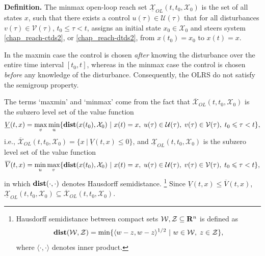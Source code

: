 \documentclass[letterpaper,10pt,english]{sphinxmanual}
\begin{document}
\textbf{Definition.} The minmax open-loop reach set
\(\underline{{\mathcal X}}_{OL}(t, t_0, {\mathcal X}_0)\) is the set
of all states \(x\), such that there exists a control
\(u(\tau)\in{\mathcal U}(\tau)\) that for all disturbances
\(v(\tau)\in{\mathcal V}(\tau)\), \(t_0\leqslant\tau<t\),
assigns an initial state \(x_0\in{\mathcal X}_0\) and steers system
\eqref{chap_reach-ctds2}, or \eqref{chap_reach-dtds2}, from \(x(t_0)=x_0\) to \(x(t)=x\).

In the maxmin case the control is chosen
\emph{after} knowing the disturbance over the entire time interval
\([t_0, t]\), whereas in the minmax case the control is chosen
\emph{before} any knowledge of the disturbance. Consequently, the OLRS do not
satisfy the semigroup property.

The terms ‘maxmin’ and ‘minmax’ come from the fact that
\(\overline{{\mathcal X}}_{OL}(t, t_0, {\mathcal X}_0)\) is the
subzero level set of the value function
\label{chap_reach:equation-maxminvf}\begin{gather}
\begin{split}\underline{V}(t, x) =
\max_v\min_u\{{\bf dist}(x(t_0), {\mathcal X}_0) ~|~ x(t)=x, \; u(\tau)\in{\mathcal U}(\tau), \;
v(\tau)\in{\mathcal V}(\tau), \; t_0\leqslant\tau<t\},\end{split}\label{chap_reach-maxminvf}
\end{gather}
i.e.,
\(\overline{{\mathcal X}}_{OL}(t, t_0, {\mathcal X}_0) = \{ x~|~\underline{V}(t, x) \leqslant0\}\),
and \(\underline{{\mathcal X}}_{OL}(t, t_0, {\mathcal X}_0)\) is the
subzero level set of the value function
\label{chap_reach:equation-minmaxvf}\begin{gather}
\begin{split}\overline{V}(t, x) =
\min_u\max_v\{{\bf dist}(x(t_0), {\mathcal X}_0) ~|~ x(t)=x, \; u(\tau)\in{\mathcal U}(\tau), \;
v(\tau)\in{\mathcal V}(\tau), \; t_0\leqslant\tau<t\},\end{split}\label{chap_reach-minmaxvf}
\end{gather}
in which \({\bf dist}(\cdot, \cdot)\) denotes Hausdorff
semidistance. \footnote{
Hausdorff semidistance between compact sets
\({\mathcal W}, {\mathcal Z}\subseteq {\bf R}^n\) is defined as
\begin{gather}
\begin{split}{\bf dist}({\mathcal W}, {\mathcal Z}) = \min\{\langle w-z, w-z\rangle^{1/2}
~|~ w\in{\mathcal W}, \; z\in{\mathcal Z}\},\end{split}\notag
\end{gather}
where \(\langle\cdot, \cdot\rangle\) denotes inner product.
} Since
\(\underline{V}(t, x)\leqslant\overline{V}(t, x)\),
\(\underline{{\mathcal X}}_{OL}(t, t_0, {\mathcal X}_0)\subseteq\overline{{\mathcal X}}_{OL}(t, t_0, {\mathcal X}_0)\).
\end{document}
